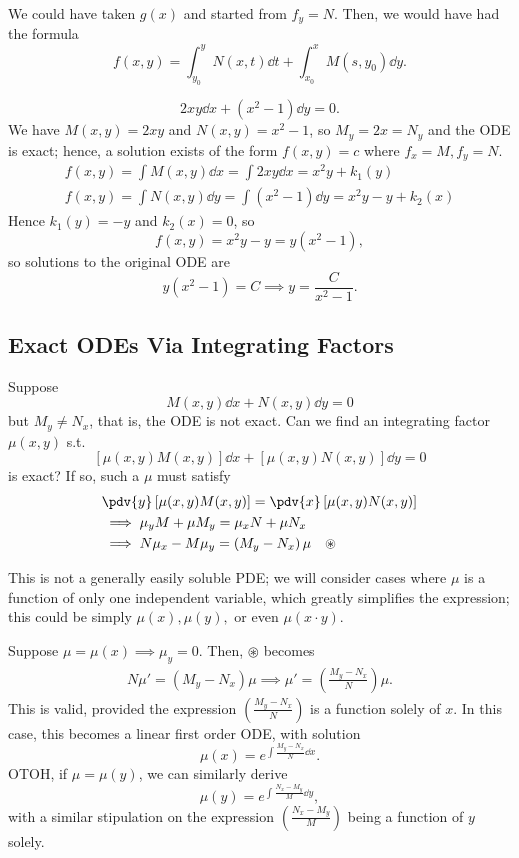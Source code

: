 \begin{remark}
    We could have taken $g(x)$ and started from $f_y = N$. Then, we would have had the formula \[
    f(x, y) = \int_{y_0}^y  N(x, t) \dd{t} + \int_{x_0}^x M(s, y_0) \dd{y}.
    \]
\end{remark}

\begin{example}
    \[
    2xy \dd{x} + (x^2 - 1) \dd{y} = 0.
    \]
    We have $M(x, y) = 2xy$ and $N(x, y) = x^2 - 1$, so $M_y = 2x = N_y$ and the ODE is exact; hence, a solution exists of the form $f(x, y) = c$ where $f_x = M, f_y =N$. \begin{align*}
        f(x, y) = \int M (x, y) \dd{x} = \int 2xy \dd{x} = x^2y + k_1(y)\\
        f(x, y) = \int N(x, y) \dd{y} = \int (x^2 - 1) \dd{y} = x^2y-y + k_2(x)
    \end{align*}
    Hence $k_1(y) = -y$ and $k_2(x) = 0$, so \[
    f(x, y) = x^2y - y = y(x^2 - 1),
    \]
    so solutions to the original ODE are \[
    y(x^2 - 1) = C \implies y = \frac{C}{x^2 - 1}.    
    \]
\end{example}

\subsection{Exact ODEs Via Integrating Factors}

Suppose $$M(x,y)\dd{x} + N(x,y) \dd{y} = 0$$ but $M_y \neq N_x$, that is, the ODE is not exact. Can we find an integrating factor $\mu(x, y)$ s.t. \[
\left[\mu(x, y) M(x, y)\right]\dd{x} + \left[\mu(x, y) N(x, y)\right]\dd{y} = 0
\]
is exact? If so, such a $\mu$ must satisfy \begin{align*}
    &\pdv{y} \left[\mu(x, y) M(x, y)\right] = \pdv{x} \left[\mu(x, y) N(x, y)\right]\\
    &\implies \mu_y M + \mu M_y = \mu_x N + \mu N_x\\
    &\implies N \mu_x - M \mu_y = \left(M_y - N_x\right)\mu \quad \circledast
\end{align*}

This is not a generally easily soluble PDE; we will consider cases where $\mu$ is a function of only one independent variable, which greatly simplifies the expression; this could be simply $\mu(x), \mu(y), $ or even $\mu(x\cdot y)$.

Suppose $\mu = \mu(x) \implies \mu_y = 0$. Then, $\circledast$ becomes \begin{align*}
N \mu' = (M_y - N_x) \mu 
\implies \mu' = \left(\frac{M_y - N_x}{N}\right)\mu.
\end{align*}
This is valid, provided the expression $\left(\frac{M_y - N_x}{N}\right)$ is a function solely of $x$. In this case, this becomes a linear first order ODE, with solution \[
\mu(x) = e^{\int \frac{M_y - N_x}{N} \dd{x}}.
\]
OTOH, if $\mu = \mu(y)$, we can similarly derive \[
\mu(y) = e^{\int \frac{N_x - M_y}{M} \dd{y}},
\]
with a similar stipulation on the expression $\left(\frac{N_x - M_y}{M}\right)$ being a function of $y$ solely.

